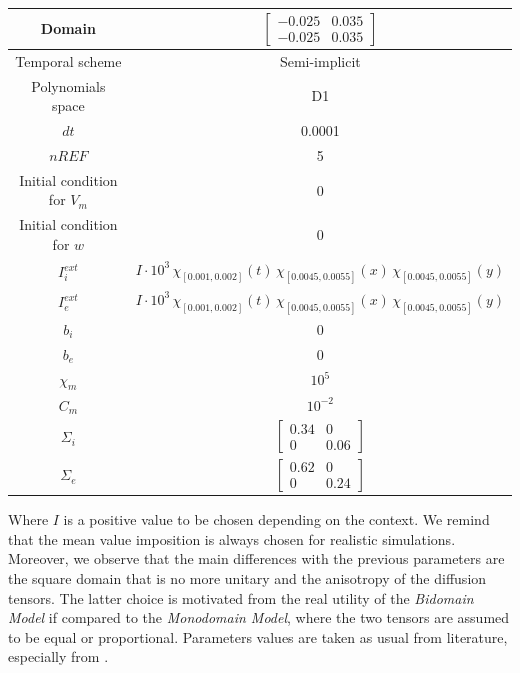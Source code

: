 \documentclass[a4paper,11pt]{article}
\begin{document}
\begin{center}
	\begin{tabular}{|c|c|} 
		\hline 
		\rule[-4mm]{0mm}{1cm}
		Domain & $\begin{bmatrix} -0.025 & 0.035 \\ -0.025 & 0.035\end{bmatrix}$ \\
		\hline
		\rule[-4mm]{0mm}{1cm}
		Temporal scheme & Semi-implicit \\
		\hline
		\rule[-4mm]{0mm}{1cm}
		Polynomials space & D1 \\
		\hline
		\rule[-4mm]{0mm}{1cm}
		$dt$ & 0.0001 \\
		\hline
		\rule[-4mm]{0mm}{1cm}
		$nREF$ & 5 \\ 
		\hline
		\rule[-4mm]{0mm}{1cm}
		Initial condition for $V_m$ & 0 \\
		\hline
		\rule[-4mm]{0mm}{1cm}
		Initial condition for $w$ & 0 \\
		\hline
		\rule[-4mm]{0mm}{1cm}
		$I_i^{ext}$ & $I \cdot 10^3 \, \chi_{[0.001,0.002]}(t) \, \chi_{[0.0045,0.0055]}(x) \, \chi_{[0.0045,0.0055]}(y)$ \\
		\hline
		\rule[-4mm]{0mm}{1cm}
		$I_e^{ext}$ & $I \cdot 10^3 \, \chi_{[0.001,0.002]}(t) \, \chi_{[0.0045,0.0055]}(x) \, \chi_{[0.0045,0.0055]}(y)$ \\
		\hline
		\rule[-4mm]{0mm}{1cm}
		$b_i$ & 0 \\
		\hline
		\rule[-4mm]{0mm}{1cm}
		$b_e$ & 0 \\
		\hline 
		\rule[-4mm]{0mm}{1cm}
		$\chi_m$ & $10^5$ \\
		\hline 
		\rule[-4mm]{0mm}{1cm}
		$C_m$ & $10^{-2}$ \\
		\hline
		\rule[-4mm]{0mm}{1cm}
		$\Sigma_i$ & $\begin{bmatrix} 0.34 & 0 \\ 0 & 0.06\end{bmatrix}$ \\
		\hline
		\rule[-4mm]{0mm}{1cm}
		$\Sigma_e$ & $\begin{bmatrix} 0.62 & 0 \\ 0 & 0.24 \end{bmatrix}$ \\
		\hline 
	\end{tabular}
\end{center}
 \vspace{4mm}
\noindent Where $I$ is a positive value to be chosen depending on the context. We remind that the mean value imposition is always chosen for realistic simulations. Moreover, we observe that the main differences with the previous parameters are the square domain that is no more unitary and the anisotropy of the diffusion tensors. The latter choice is motivated from the real utility of the \emph{Bidomain Model} if compared to the \emph{Monodomain Model}, where the two tensors are assumed to be equal or proportional. Parameters values are taken as usual from literature, especially from \cite{acta}. \\
\end{document}
